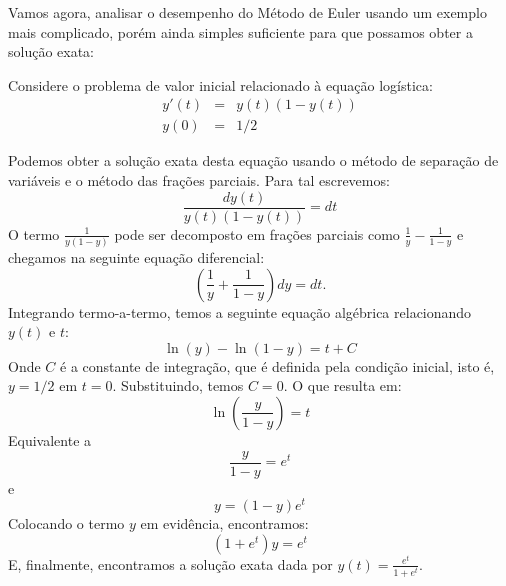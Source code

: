 Vamos agora, analisar o desempenho do Método de Euler usando um exemplo mais complicado, porém ainda simples suficiente para que possamos obter a solução exata:  
\begin{ex}{\label{ex_euler_1}} Considere o problema de valor inicial relacionado à equação logística:
\begin{eqnarray*}
y'(t)&=&y(t)(1-y(t))\\
y(0)&=&1/2
\end{eqnarray*}
\end{ex}
Podemos obter a solução exata desta equação usando o método de separação de variáveis e o método das frações parciais. Para tal escrevemos:
\begin{equation*}
\frac{dy(t)}{y(t)(1-y(t))}=dt
\end{equation*}
O termo $\frac{1}{y(1-y)}$ pode ser decomposto em frações parciais como $\frac{1}{y}-\frac{1}{1-y}$ e chegamos na seguinte equação diferencial:
\begin{equation*}
\left(\frac{1}{y}+\frac{1}{1-y}\right)dy=dt.
\end{equation*}
Integrando termo-a-termo, temos a seguinte equação algébrica relacionando $y(t)$ e $t$:
\begin{equation*}
\ln(y)-\ln(1-y)=t+C
\end{equation*}
Onde $C$ é a constante de integração, que é definida pela condição inicial, isto é, $y=1/2$ em $t=0$. Substituindo, temos $C=0$. O que resulta em:
\begin{equation*}
\ln\left(\frac{y}{1-y}\right)=t
\end{equation*}
Equivalente a
\begin{equation*}
\frac{y}{1-y}=e^{t}
\end{equation*}
e
\begin{equation*}
y=(1-y)e^{t} 
\end{equation*}
Colocando o termo $y$ em evidência, encontramos:
\begin{equation}
(1+e^t)y=e^{t} 
\end{equation}
E, finalmente, encontramos a solução exata dada por $y(t)=\frac{e^t}{1+e^{t}}$.

